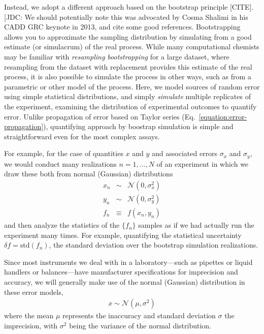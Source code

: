 \documentclass[aps,pre,twocolumn,nofootinbib,superscriptaddress,linenumbers]{revtex4-1}
\begin{document}
Instead, we adopt a different approach based on the bootstrap principle {\color{red}[CITE]}.
{\color{red}[JDC: We should potentially note this was advocated by Cosma Shalimi in his CADD GRC keynote in 2013, and cite some good references.}
Bootstrapping allows you to approximate the sampling distribution by simulating from a good estimate (or simulacrum) of the real process.
While many computational chemists may be familiar with \emph{resampling bootstrapping} for a large dataset, where resampling from the dataset with replacement provides this estimate of the real process, it is also possible to simulate the process in other ways, such as from a parametric or other model of the process.
Here, we model sources of random error using simple statistical distributions, and simply \emph{simulate} multiple replicates of the experiment, examining the distribution of experimental outcomes to quantify error.
Unlike propagation of error based on Taylor series (Eq.~\ref{equation:error-propagation}), quantifying approach by boostrap simulation is simple and straightforward even for the most complex assays.

For example, for the case of  quantities $x$ and $y$ and associated errors $\sigma_x$ and $\sigma_y$, we would conduct many realizations $n = 1, \ldots, N$ of an experiment in which we draw these both from normal (Gaussian) distributions
\begin{eqnarray}
x_n &\sim& \mathcal{N}(0, \sigma^2_x) \nonumber \\
y_n &\sim& \mathcal{N}(0, \sigma^2_y) \nonumber \\
f_n &\equiv& f(x_n, y_n)
\end{eqnarray}
and then analyze the statistics of the $\{f_n\}$ samples as if we had actually run the experiment many times.
For example, quantifying the statistical uncertainty $\delta f = \mathrm{std}(f_n)$, the standard deviation over the bootstrap simulation realizations.

Since most instruments we deal with in a laboratory---such as pipettes or liquid handlers or balances---have manufacturer specifications for imprecision and accuracy, we will generally make use of the normal (Gaussian) distribution in these error models,
\begin{eqnarray}
x \sim \mathcal{N}(\mu, \sigma^2) \label{eq:1}
\end{eqnarray}
where the mean $\mu$ represents the inaccuracy and standard deviation $\sigma$ the imprecision, with $\sigma^2$ being the variance of the normal distribution.
\end{document}
